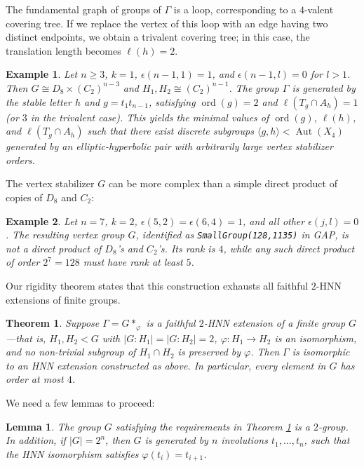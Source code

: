 \documentclass[12pt,leqno]{amsart}
\newcommand{\2}{L^2_{\rm per}(0, T)}
\newtheorem{thm}{Theorem}[section]
\newtheorem{lem}{Lemma}[section]
\newtheorem{exm}{Example}[section]
\newcommand{\aut}{{\operatorname{Aut}}}
\newcommand{\ord}{{\operatorname{ord}}}
\numberwithin{equation}{section}
\numberwithin{figure}{section}
\begin{document}
The fundamental graph of groups of $\Gamma$ is a loop, corresponding to a $4$-valent covering tree. If we replace the vertex of this loop with an edge having two distinct endpoints, we obtain a trivalent covering tree; in this case, the translation length becomes $\ell(h) = 2$.
\begin{exm}
    Let $n\geq 3$, $k=1$, $\epsilon(n-1,1) = 1$, and $\epsilon(n-1,l) = 0$ for $l>1$. Then $G\cong D_8\times (C_2)^{n-3}$ and $H_1,H_2\cong (C_2)^{n-1}$. The group $\Gamma$ is generated by the stable letter $h$ and $g=t_1t_{n-1}$, satisfying $\ord(g) = 2$ and $\ell(T_g\cap A_h) = 1$ (or $3$ in the trivalent case). This yields the minimal values of $\ord(g)$, $\ell(h)$, and $\ell(T_g\cap A_h)$ such that there exist discrete subgroups $\langle g,h\rangle < \aut(X_4)$ generated by an elliptic-hyperbolic pair with arbitrarily large vertex stabilizer orders.
\end{exm}
The vertex stabilizer $G$ can be more complex than a simple direct product of copies of $D_8$ and $C_2$:
\begin{exm}
    Let $n=7$, $k=2$, $\epsilon(5,2) = \epsilon(6,4) = 1$, and all other $\epsilon(j,l) = 0$. The resulting vertex group $G$, identified as \texttt{SmallGroup(128,1135)} in \textit{GAP}, is not a direct product of $D_8$'s and $C_2$'s. Its rank is $4$, while any such direct product of order $2^7 = 128$ must have rank at least $5$.
\end{exm}
Our rigidity theorem states that this construction exhausts all faithful $2$-HNN extensions of finite groups.
\begin{thm}\label{thm:HNN_rigidity}
    Suppose $\Gamma = G*_{\varphi}$ is a faithful $2$-HNN extension of a finite group $G$—that is, $H_1,H_2 < G$ with $\lvert G:H_1\rvert = \lvert G:H_2\rvert = 2$, $\varphi: H_1 \to H_2$ is an isomorphism, and no non-trivial subgroup of $H_1 \cap H_2$ is preserved by $\varphi$. Then $\Gamma$ is isomorphic to an HNN extension constructed as above. In particular, every element in $G$ has order at most $4$.
\end{thm}
We need a few lemmas to proceed:
\begin{lem}\label{lem:pres}
    The group $G$ satisfying the requirements in Theorem \ref{thm:HNN_rigidity} is a $2$-group. In addition, if $\lvert G\rvert = 2^n$, then $G$ is generated by $n$ involutions $t_1,\dots, t_n$, such that the HNN isomorphism satisfies $\varphi(t_i) = t_{i+1}$.
\end{lem}
\end{document}

